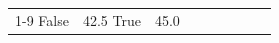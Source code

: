 \begin{table}[H]
\begin{tabular}{lllrlllll}
\cline{1-9}
False & 42.5%
\cline{1-9}
True & 45.0%

\end{tabular}
\end{table}
